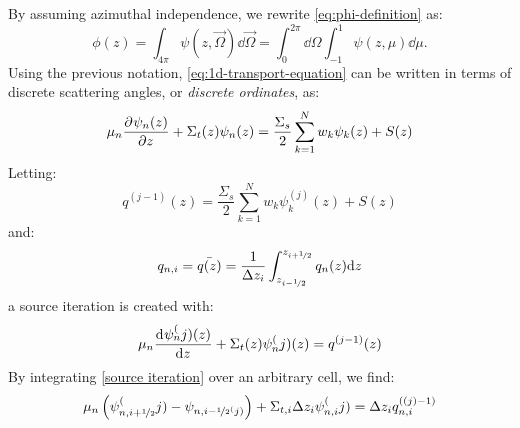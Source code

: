 \documentclass{NE515}
\theoremstyle{definition}
\begin{document}
    By assuming azimuthal independence, we rewrite \cref{eq:phi-definition} as:
    \begin{equation}
        \phi(z)=\int_{4\pi}^{}\psi(z,\vec{\Omega})\dd \vec{\Omega} = \int_{0}^{2\pi } \dd \Omega \int_{-1}^{1} \psi(z,\mu)\dd \mu.
    \end{equation}
    Using the previous notation, \cref{eq:1d-transport-equation} can be written in terms of discrete scattering angles, or \textit{discrete ordinates}, as:
    \begin{equation}
        \mu_n \pdv[]{\psi_n (z)}{z}+\Sigma_t(z)\psi_n(z)=\frac{\Sigma_s}{2}\sum_{k=1}^{N} w_k \psi_k(z)+S(z)
    \end{equation}
    Letting:
    \begin{equation}
        q^{(j-1)}(z) = \frac{\Sigma_s}{2}\sum_{k=1}^{N} w_k \psi^(j)_k(z)+S(z)
    \end{equation}
    and:
    \begin{equation}
        q_{n,i}=\bar{q(z)}=\frac{1}{\Delta z_i}\int_{z_{i-\nicefrac{1}{2}}}^{z_{i+\nicefrac{1}{2}}} q_n(z)\dd z
    \end{equation}
    a source iteration is created with:
    \begin{equation}
        \label{source iteration}
        \mu_n \dv[]{\psi_n^(j)(z)}{z}+\Sigma_t(z)\psi_n^(j)(z)=q^{(j-1)}(z)
    \end{equation}
    By integrating \cref{source iteration} over an arbitrary cell, we find:
    \begin{equation}
        \mu_n\left( \psi_{n,i+\nicefrac{1}{2}}^(j)-\psi_{n,i-\nicefrac{1}{2}^(j)} \right)+\Sigma_{t,i}\Delta z_i \psi_{n,i}^(j)=\Delta z_i q_{n,i}^{((j)-1)}
    \end{equation}
\end{document}
